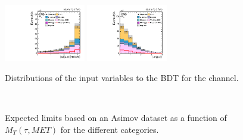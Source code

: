 \begin{figure}[htpb]
 \includegraphics[width=0.315\textwidth]{chapter6/BDTvariable/LFV_preselection_m_t_DPhi_Fakes_PoissonErrors.pdf}
 \includegraphics[width=0.315\textwidth]{chapter6/BDTvariable/LFV_preselection_m_t_DEta_Fakes_PoissonErrors.pdf}
\caption{Distributions of the  input variables to the BDT for the \Hmuhad channel.}
 \label{fig:BDT_input_var_mutauhad}
\end{figure}


\begin{figure}[htbp] 
     \centering
     \\
     \caption{Expected limits based on an Asimov dataset as a function of $M_T(\tau, MET)$ for the different categories.}
     \label{fig:BDTvarcorrelation}
\end{figure}


